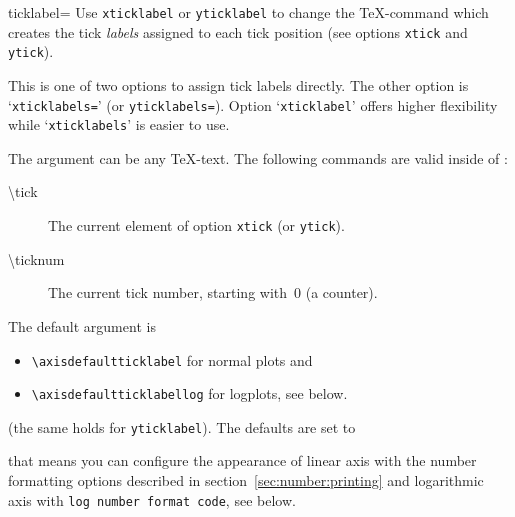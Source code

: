 \begin{pgfplotsxykey}{\x ticklabel=}
Use \texttt{xticklabel} or \texttt{yticklabel} to change the \TeX-command which creates the tick \emph{labels} assigned to each tick position (see options \texttt{xtick} and \texttt{ytick}). 

This is one of two options to assign tick labels directly. The other option is `\texttt{xticklabels=}' (or \texttt{yticklabels=}). Option `\texttt{xticklabel}' offers higher flexibility while `\texttt{xticklabels}' is easier to use.

The argument  can be any \TeX-text. The following commands are valid inside of :
\begin{description}
	\item[\textbackslash tick] The current element of option \lstinline!xtick! (or \lstinline!ytick!).
	\item[\textbackslash ticknum] The current tick number, starting with~0 (a counter).
\end{description}
The default argument is 
\begin{itemize}
	\item \lstinline!\axisdefaultticklabel! for normal plots and 
	\item \lstinline!\axisdefaultticklabellog! for logplots, see below.
\end{itemize}
(the same holds for \lstinline!yticklabel!). The defaults are set to
\begin{codeexample}
\def\axisdefaultticklabel{%
	$\pgfmathprintnumber{\tick}$%
}

\def\axisdefaultticklabellog{%
	\pgfkeysgetvalue{/pgfplots/log number format code/.@cmd}\pgfplots@log@label@style
	\expandafter\pgfplots@log@label@style\tick\pgfeov
}
\end{codeexample}
that means you can configure the appearance of linear axis with the number formatting options described in section~\ref{sec:number:printing} and logarithmic axis with \texttt{log number format code}, see below.


\end{pgfplotsxykey}
